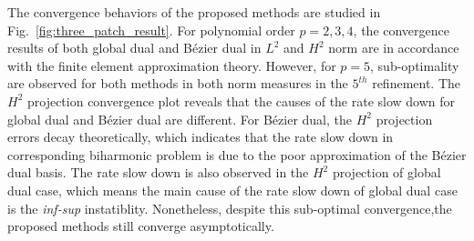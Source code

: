 \documentclass[preprint,12pt]{elsarticle}
\theoremstyle{remark}
\begin{document}
The convergence behaviors of the proposed methods are studied in Fig.~\ref{fig:three_patch_result}. For polynomial order $p=2,3,4$, the convergence results of both global dual and B\'ezier dual in $L^2$ and $H^2$ norm are in accordance with the finite element approximation theory. However, for $p=5$, sub-optimality are observed for both methods in both norm measures in the $5^{th}$ refinement. The $H^2$ projection convergence plot reveals that the causes of the rate slow down for global dual and B\'ezier dual are different. For B\'ezier dual, the $H^2$ projection errors decay theoretically, which indicates that the rate slow down in corresponding biharmonic problem is due to the poor approximation of the B\'ezier dual basis. The rate slow down is also observed in the $H^2$ projection of global dual case, which means the main cause of the rate slow down of global dual case is the \textit{inf-sup} instatiblity. Nonetheless, despite this sub-optimal convergence,the proposed methods still converge asymptotically. \par
\end{document}
